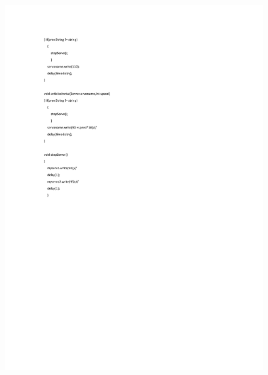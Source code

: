 \begin{figure}[h]
\centering
\includegraphics[width=1\textwidth,height=0.7\textheight]{A_thesis/appendix/code_arduino-2.png}
\end{figure}
\newpage

